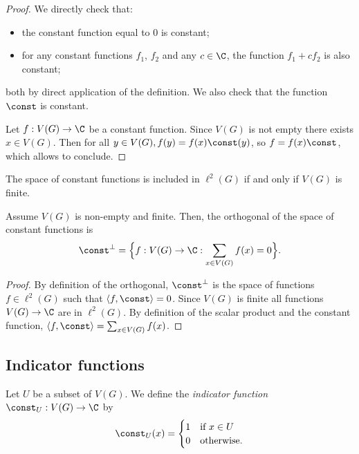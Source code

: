 \begin{proof}
  We directly check that:
  \begin{itemize}
    \item the constant function equal to $0$ is constant;
    \item for any constant functions $f_1$, $f_2$ and any $c \in \C$,
    the function $f_1+cf_2$ is also constant;
  \end{itemize}
  both by direct application of the definition.
  We also check that the function $\const$ is constant.

  Let $f : V(G) \rightarrow \C$ be a constant function. Since $V(G)$ is not
  empty there exists $x \in V(G)$. Then for all $y \in V(G), f(y) = f(x) \const(y)$,
  so $f = f(x) \const$, which allows to conclude.
\end{proof}

\begin{lemma}
  \label{lem:constant_is_l2}
  The space of constant functions is included in $\ell^2(G)$
  if and only if $V(G)$ is finite.
\end{lemma}

\begin{lemma}
  \label{lem:orth_constant}
  Assume $V(G)$ is non-empty and finite.
  Then, the orthogonal of the space of constant functions is
  \begin{equation*}
    \const^\perp = \Big\{ f : V(G) \rightarrow \C :
    \sum_{x \in V(G)}f(x)=0 \Big\}.
  \end{equation*}
\end{lemma}

\begin{proof}
  By definition of the orthogonal, $\const^\perp$ is the space of functions $f \in \ell^2(G)$
  such that $\langle f, \const \rangle = 0$.
  Since $V(G)$ is finite all functions $V(G) \rightarrow \C$ are in $\ell^2(G)$.
  By definition of the scalar product and the constant function,
  $\langle f, \const \rangle = \sum_{x \in V(G)}f(x)$.
\end{proof}

\subsection{Indicator functions}

\begin{definition}
  \label{def:indicator_function}
  Let $U$ be a subset of $V(G)$. We define the \emph{indicator function}
  $\const_U : V(G) \rightarrow \C$ by
  \begin{equation}
    \const_U (x) =
    \begin{cases}
      1 & \text{if } x \in U \\
      0 & \text{otherwise}.
    \end{cases}
  \end{equation}
\end{definition}

